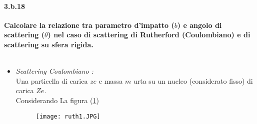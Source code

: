 \documentclass[twoside]{article}
\begin{document}
\paragraph{3.b.18}\textbf{Calcolare la relazione tra parametro d'impatto ($b$) e angolo di scattering ($\theta$) nel
caso di scattering di Rutherford (Coulombiano) e di scattering su sfera rigida.}\\ \\
\begin{itemize}
    \item \textit{Scattering Coulombiano :}\\
    Una particella di carica $ze$ e massa $m$ urta su un nucleo (considerato fisso) di carica $Ze$.\\
    Considerando La figura (\ref{ruth1})
   \begin{figure}[ht]
    \begin{center}
    \texttt{[image: ruth1.JPG]}
    \end{center}
    \label{ruth1}
    \end{figure}
    

\end{itemize}
\end{document}
